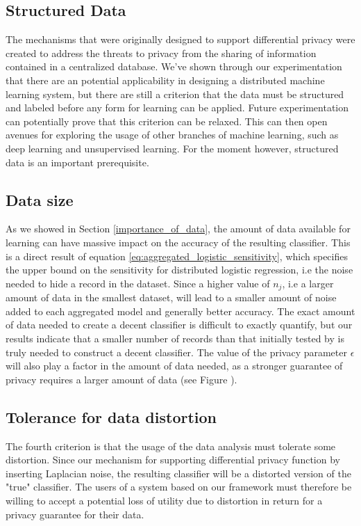 \subsection{Structured Data}
The mechanisms that were originally designed to support differential privacy were created to address the threats to privacy from the sharing of information contained in a centralized database. We've shown through our experimentation that there are an potential applicability in designing a distributed machine learning system, but there are still a criterion that the data must be structured and labeled before any form for learning can be applied. Future experimentation can potentially prove that this criterion can be relaxed. This can then open avenues for exploring the usage of other branches of machine learning, such as deep learning and unsupervised learning. For the moment however, structured data is an important prerequisite.

\subsection{Data size}
As we showed in Section \ref{importance_of_data}, the amount of data available for learning can have massive impact on the accuracy of the resulting classifier. This is a direct result of equation \ref{eq:aggregated_logistic_sensitivity}, which specifies the upper bound on the sensitivity for distributed logistic regression, i.e the noise needed to hide a record in the dataset. Since a higher value of $n_j$, i.e a larger amount of data in the smallest dataset, will lead to a smaller amount of noise added to each aggregated model and generally better accuracy. The exact amount of data needed to create a decent classifier is difficult to exactly quantify, but our results indicate that a smaller number of records than that initially tested by \cite{pathak2010diffprivhomo} is truly needed to construct a decent classifier. The value of the privacy parameter $\epsilon$ will also play a factor in the amount of data needed, as a stronger guarantee of privacy requires a larger amount of data (see Figure ).

\subsection{Tolerance for data distortion}
The fourth criterion is that the usage of the data analysis must tolerate some distortion. Since our mechanism for supporting differential privacy function by inserting Laplacian noise, the resulting classifier will be a distorted version of the "true" classifier. The users of a system based on our framework must therefore be willing to accept a potential loss of utility due to distortion in return for a privacy guarantee for their data. 

